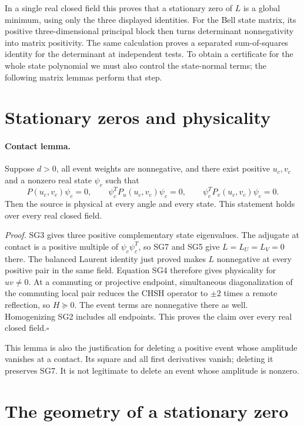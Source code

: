 In a single real closed field this proves that a stationary zero of
$L$ is a global minimum, using only the three displayed identities.
For the Bell state matrix, its positive three-dimensional principal
block then turns determinant nonnegativity into matrix positivity.
The same calculation proves a separated sum-of-squares identity for
the determinant at independent tests. To obtain a certificate for the
whole state polynomial we must also control the state-normal terms;
the following matrix lemmas perform that step.


\section{Stationary zeros and physicality}

\paragraph{Contact lemma.}
Suppose $d>0$, all event weights are nonnegative, and there exist
positive $u_c,v_c$ and a nonzero real state $\psi_c$ such that
\[
 P(u_c,v_c)\psi_c=0,
 \qquad\psi_c^TP_u(u_c,v_c)\psi_c=0,
 \qquad\psi_c^TP_v(u_c,v_c)\psi_c=0.                    \tag{SG7}
\]
Then the source is physical at every angle and every state.  This
statement holds over every real closed field.

\emph{Proof.}
SG3 gives three positive complementary state eigenvalues. The adjugate
at contact is a positive multiple of $\psi_c\psi_c^T$, so SG7 and SG5
give $L=L_U=L_V=0$ there. The balanced Laurent identity just proved
makes $L$ nonnegative at every positive pair in the same field.
Equation SG4 therefore gives physicality for $uv\ne0$.
At a commuting or projective endpoint, simultaneous diagonalization
of the commuting local pair reduces the CHSH operator to $\pm2$
times a remote reflection, so $H\succeq0$. The event terms are
nonnegative there as well. Homogenizing SG2 includes all endpoints.
This proves the claim over every real closed field.\hfill$\square$

This lemma is also the justification for deleting a positive event
whose amplitude vanishes at a contact.  Its square and all first
derivatives vanish; deleting it preserves SG7.  It is not legitimate
to delete an event whose amplitude is nonzero.

\section{The geometry of a stationary zero}

